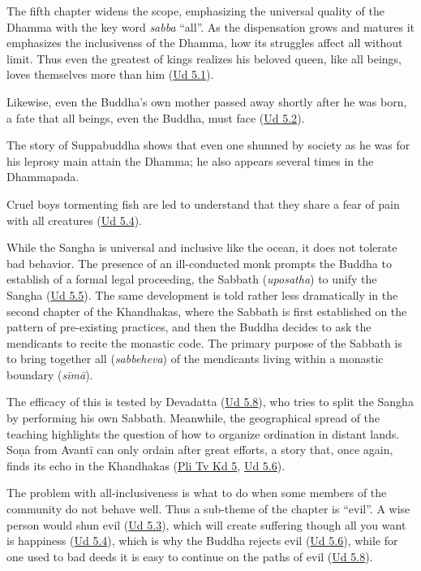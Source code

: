 \documentclass[12pt,openany]{book}%
\begin{document}
The fifth chapter widens the scope, emphasizing the universal quality of the Dhamma with the key word \textit{sabba} “all”. As the dispensation grows and matures it emphasizes the inclusivenss of the Dhamma, how its struggles affect all without limit. Thus even the greatest of kings realizes his beloved queen, like all beings, loves themselves more than him (\href{https://suttacentral.net/ud5.1/en/sujato}{Ud 5.1}). 

Likewise, even the Buddha’s own mother passed away shortly after he was born, a fate that all beings, even the Buddha, must face (\href{https://suttacentral.net/ud5.2/en/sujato}{Ud 5.2}). 

The story of Suppabuddha shows that even one shunned by society as he was for his leprosy main attain the Dhamma; he also appears several times in the Dhammapada.

 Cruel boys tormenting fish are led to understand that they share a fear of pain with all creatures (\href{https://suttacentral.net/ud5.4/en/sujato}{Ud 5.4}). 

 While the Sangha is universal and inclusive like the ocean, it does not tolerate bad behavior. The presence of an ill-conducted monk prompts the Buddha to establish of a formal legal proceeding, the Sabbath (\textit{uposatha}) to unify the Sangha (\href{https://suttacentral.net/ud5.5/en/sujato}{Ud 5.5}). The same development is told rather less dramatically in the second chapter of the Khandhakas, where the Sabbath is first established on the pattern of pre-existing practices, and then the Buddha decides to ask the mendicants to recite the monastic code. The primary purpose of the Sabbath is to bring together all (\textit{sabbeheva}) of the mendicants living within a monastic boundary (\textit{\textsanskrit{sīmā}}). 

 The efficacy of this is tested by Devadatta (\href{https://suttacentral.net/ud5.8/en/sujato}{Ud 5.8}), who tries to split the Sangha by performing his own Sabbath. Meanwhile, the geographical spread of the teaching highlights the question of how to organize ordination in distant lands. \textsanskrit{Soṇa} from \textsanskrit{Avantī} can only ordain after great efforts, a story that, once again, finds its echo in the Khandhakas (\href{https://suttacentral.net/pli{-}tv{-}kd5/en/brahmali}{Pli Tv Kd 5}, \href{https://suttacentral.net/ud5.6/en/sujato}{Ud 5.6}). 

 The problem with all-inclusiveness is what to do when some members of the community do not behave well. Thus a sub-theme of the chapter is “evil”. A wise person would shun evil (\href{https://suttacentral.net/ud5.3/en/sujato}{Ud 5.3}), which will create suffering though all you want is happiness (\href{https://suttacentral.net/ud5.4/en/sujato}{Ud 5.4}), which is why the Buddha rejects evil (\href{https://suttacentral.net/ud5.6/en/sujato}{Ud 5.6}), while for one used to bad deeds it is easy to continue on the paths of evil (\href{https://suttacentral.net/ud5.8/en/sujato}{Ud 5.8}).
\end{document}
